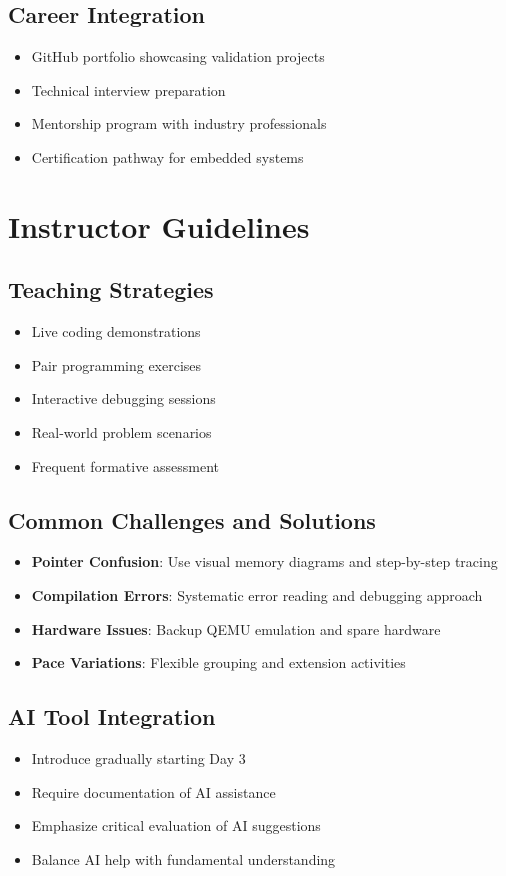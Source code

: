 \documentclass[11pt,a4paper]{article}
\begin{document}
\subsection{Career Integration}
\begin{itemize}
    \item GitHub portfolio showcasing validation projects
    \item Technical interview preparation
    \item Mentorship program with industry professionals
    \item Certification pathway for embedded systems
\end{itemize}

\section{Instructor Guidelines}

\subsection{Teaching Strategies}
\begin{itemize}
    \item Live coding demonstrations
    \item Pair programming exercises
    \item Interactive debugging sessions
    \item Real-world problem scenarios
    \item Frequent formative assessment
\end{itemize}

\subsection{Common Challenges and Solutions}
\begin{itemize}
    \item \textbf{Pointer Confusion}: Use visual memory diagrams and step-by-step tracing
    \item \textbf{Compilation Errors}: Systematic error reading and debugging approach
    \item \textbf{Hardware Issues}: Backup QEMU emulation and spare hardware
    \item \textbf{Pace Variations}: Flexible grouping and extension activities
\end{itemize}

\subsection{AI Tool Integration}
\begin{itemize}
    \item Introduce gradually starting Day 3
    \item Require documentation of AI assistance
    \item Emphasize critical evaluation of AI suggestions
    \item Balance AI help with fundamental understanding
\end{itemize}
\end{document}
